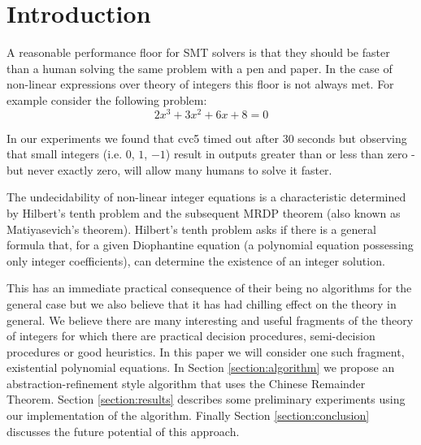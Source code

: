 \section{Introduction}


A reasonable performance floor for SMT solvers is that they should be
faster than a human solving the same problem with a pen and paper.
%
In the case of non-linear expressions over theory of integers this
floor is not always met.
%
For example consider the following problem: 
\[2x^3 + 3x^2 + 6x + 8 = 0\]

In our experiments we found that cvc5 timed out after 30 
seconds but observing that small integers (i.e. $0$, $1$, $-1$)
result in outputs greater than or less than zero - but never exactly
zero, will allow many humans to solve it faster.

The undecidability of non-linear integer equations is a characteristic
determined by Hilbert's tenth problem and the subsequent MRDP theorem 
(also known as Matiyasevich's theorem). Hilbert's tenth problem asks 
if there is a general formula that, for a given Diophantine equation 
(a polynomial equation possessing only integer coefficients), can 
determine the existence of an integer solution.

This has an immediate practical consequence of their being no
algorithms for the general case but we also believe that it has had
chilling effect on the theory in general.
%
We believe there are many interesting and useful fragments of the
theory of integers for which there are practical decision procedures,
semi-decision procedures or good heuristics.
In this paper we will consider one such fragment, existential
polynomial equations.
%
In Section \ref{section:algorithm} we propose an
abstraction-refinement style algorithm that uses the Chinese Remainder
Theorem.
Section \ref{section:results} describes some preliminary experiments
using our implementation of the algorithm.
Finally Section \ref{section:conclusion} discusses the future
potential of this approach.

